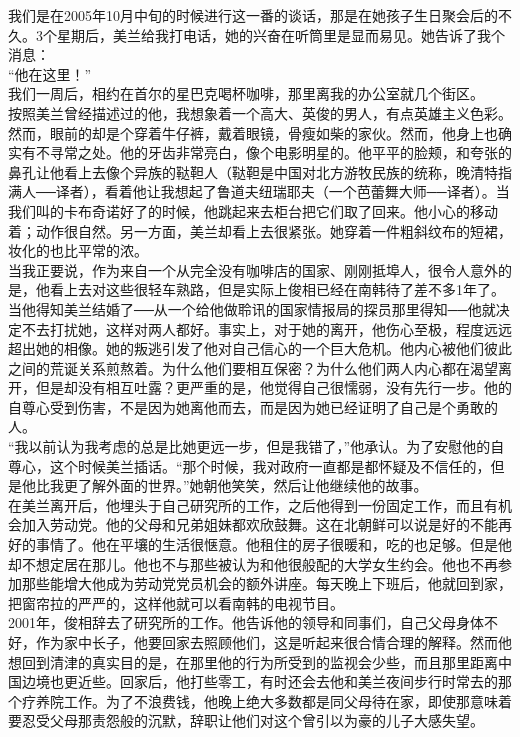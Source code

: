 我们是在2005年10月中旬的时候进行这一番的谈话，那是在她孩子生日聚会后的不久。3个星期后，美兰给我打电话，她的兴奋在听筒里是显而易见。她告诉了我个消息：\\

“他在这里！”\\

我们一周后，相约在首尔的星巴克喝杯咖啡，那里离我的办公室就几个街区。\\

按照美兰曾经描述过的他，我想象着一个高大、英俊的男人，有点英雄主义色彩。然而，眼前的却是个穿着牛仔裤，戴着眼镜，骨瘦如柴的家伙。然而，他身上也确实有不寻常之处。他的牙齿非常亮白，像个电影明星的。他平平的脸颊，和夸张的鼻孔让他看上去像个异族的鞑靼人（鞑靼是中国对北方游牧民族的统称，晚清特指满人──译者），看着他让我想起了鲁道夫纽瑞耶夫（一个芭蕾舞大师──译者）。当我们叫的卡布奇诺好了的时候，他跳起来去柜台把它们取了回来。他小心的移动着；动作很自然。另一方面，美兰却看上去很紧张。她穿着一件粗斜纹布的短裙，妆化的也比平常的浓。\\

当我正要说，作为来自一个从完全没有咖啡店的国家、刚刚抵埠人，很令人意外的是，他看上去对这些很轻车熟路，但是实际上俊相已经在南韩待了差不多1年了。当他得知美兰结婚了──从一个给他做聆讯的国家情报局的探员那里得知──他就决定不去打扰她，这样对两人都好。事实上，对于她的离开，他伤心至极，程度远远超出她的相像。她的叛逃引发了他对自己信心的一个巨大危机。他内心被他们彼此之间的荒诞关系煎熬着。为什么他们要相互保密？为什么他们两人内心都在渴望离开，但是却没有相互吐露？更严重的是，他觉得自己很懦弱，没有先行一步。他的自尊心受到伤害，不是因为她离他而去，而是因为她已经证明了自己是个勇敢的人。\\

“我以前认为我考虑的总是比她更远一步，但是我错了，”他承认。为了安慰他的自尊心，这个时候美兰插话。“那个时候，我对政府一直都是都怀疑及不信任的，但是他比我更了解外面的世界。”她朝他笑笑，然后让他继续他的故事。\\

在美兰离开后，他埋头于自己研究所的工作，之后他得到一份固定工作，而且有机会加入劳动党。他的父母和兄弟姐妹都欢欣鼓舞。这在北朝鲜可以说是好的不能再好的事情了。他在平壤的生活很惬意。他租住的房子很暖和，吃的也足够。但是他却不想定居在那儿。他也不与那些被认为和他很般配的大学女生约会。他也不再参加那些能增大他成为劳动党党员机会的额外讲座。每天晚上下班后，他就回到家，把窗帘拉的严严的，这样他就可以看南韩的电视节目。\\

2001年，俊相辞去了研究所的工作。他告诉他的领导和同事们，自己父母身体不好，作为家中长子，他要回家去照顾他们，这是听起来很合情合理的解释。然而他想回到清津的真实目的是，在那里他的行为所受到的监视会少些，而且那里距离中国边境也更近些。回家后，他打些零工，有时还会去他和美兰夜间步行时常去的那个疗养院工作。为了不浪费钱，他晚上绝大多数都是同父母待在家，即使那意味着要忍受父母那责怨般的沉默，辞职让他们对这个曾引以为豪的儿子大感失望。\\

